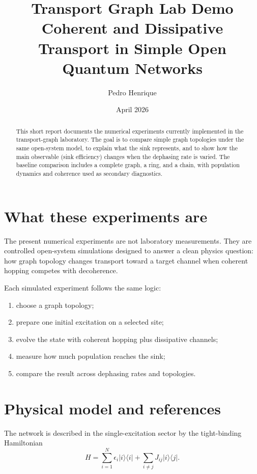 \documentclass[11pt,a4paper]{article}
\title{\textbf{Transport Graph Lab Demo}\\
\large Coherent and Dissipative Transport in Simple Open Quantum Networks}
\author{Pedro Henrique}
\date{April 2026}
\begin{document}
\maketitle

\begin{abstract}
This short report documents the numerical experiments currently implemented in
the transport-graph laboratory. The goal is to compare simple graph topologies
under the same open-system model, to explain what the sink represents, and to
show how the main observable (sink efficiency) changes when the dephasing rate
is varied. The baseline comparison includes a complete graph, a ring, and a
chain, with population dynamics and coherence used as secondary diagnostics.
\end{abstract}

\section{What these experiments are}

The present numerical experiments are not laboratory measurements. They are
controlled open-system simulations designed to answer a clean physics question:
how graph topology changes transport toward a target channel when coherent
hopping competes with decoherence.

Each simulated experiment follows the same logic:
\begin{enumerate}
  \item choose a graph topology;
  \item prepare one initial excitation on a selected site;
  \item evolve the state with coherent hopping plus dissipative channels;
  \item measure how much population reaches the sink;
  \item compare the result across dephasing rates and topologies.
\end{enumerate}

\section{Physical model and references}

The network is described in the single-excitation sector by the tight-binding
Hamiltonian
\begin{equation}
H = \sum_{i=1}^{N}\epsilon_i |i\rangle\langle i|
  + \sum_{i\neq j} J_{ij}|i\rangle\langle j|.
\end{equation}
\end{document}
